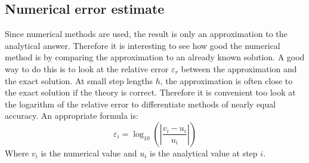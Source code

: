 \documentclass[twoside,twocolumn]{article}
\begin{document}
\subsection{Numerical error estimate}
Since numerical methods are used, the result is only an approximation to the analytical answer.
Therefore it is interesting to see how good the numerical method is by comparing the approximation to an already known solution.    
A good way to do this is to look at the relative error $\varepsilon_r$ between the approximation and the exact solution. At small step lengths $h$, the approximation is often close to the exact solution if the theory is correct. Therefore it is convenient too look at the logarithm of the relative error to differentiate methods of nearly equal accuracy. An appropriate formula is:
\begin{equation}
\varepsilon_i = \log_{10}\left(\left|\frac{v_i - u_i}{u_i}\right|\right)\label{eq:num_err}
\end{equation}
Where $v_i$ is the numerical value and $u_i$ is the analytical value at step $i$.
\end{document}
